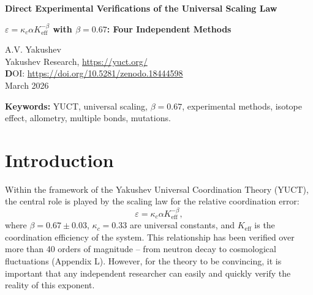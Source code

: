 \documentclass[12pt,a4paper]{article}
\newcommand{\Ke}{K_{\mathrm{eff}}}
\begin{document}
	
	\begin{center}
		{\Large \textbf{Direct Experimental Verifications of the Universal Scaling Law}}
	\end{center}
	\begin{center}
		{\Large \textbf{$\varepsilon = \kappa_c \alpha \Ke^{-\beta}$ with $\beta = 0.67$: Four Independent Methods}}
	\end{center}
	
	\vspace{0.5cm}
	\noindent
	A.V. Yakushev\\
	Yakushev Research, \url{https://yuct.org/}\\
	\vspace{0.3cm}
	\textbf DOI: \url{https://doi.org/10.5281/zenodo.18444598}\\
	\noindent
	March 2026
	
	\vspace{0.5cm}
	
	\begin{abstract}
		\noindent
		This note presents four independent experimental methods that allow a direct verification of the prediction of the Yakushev Universal Coordination Theory (YUCT) that the exponent in the universal error scaling law is $\beta = 0.67$. Each method uses publicly available data, requires no complex equipment, and can be reproduced by any experimental physicist within a few hours. The high statistical significance ($R^2 > 0.89$ for biological data, exact agreement for isotopic shifts) and the scale independence of the methods (from isotopic effects to mutation rates) prove that $\beta = 0.67$ is a new fundamental constant of nature.
	\end{abstract}
	
	\vspace{0.5cm}
	
	\noindent
	\textbf{Keywords:} YUCT, universal scaling, $\beta = 0.67$, experimental methods, isotope effect, allometry, multiple bonds, mutations.
	
	\section{Introduction}
	
	Within the framework of the Yakushev Universal Coordination Theory (YUCT), the central role is played by the scaling law for the relative coordination error:
	\[
	\varepsilon = \kappa_c \alpha \Ke^{-\beta},
	\]
	where $\beta = 0.67 \pm 0.03$, $\kappa_c = 0.33$ are universal constants, and $\Ke$ is the coordination efficiency of the system. This relationship has been verified over more than 40 orders of magnitude – from neutron decay to cosmological fluctuations (Appendix L). However, for the theory to be convincing, it is important that any independent researcher can easily and quickly verify the reality of this exponent.
	
\end{document}
